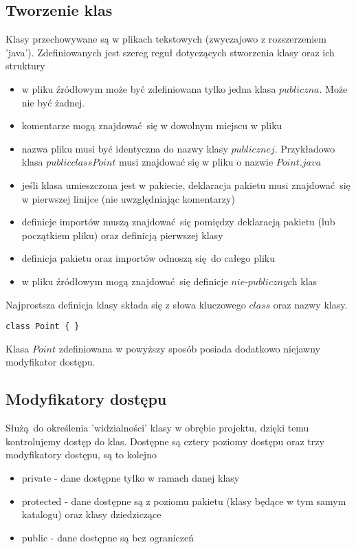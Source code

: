 \documentclass[11pt]{article}
\begin{document}
\subsection{Tworzenie klas}
Klasy przechowywane są w plikach tekstowych (zwyczajowo z rozszerzeniem 'java'). Zdefiniowanych jest szereg reguł dotyczących stworzenia klasy oraz ich struktury
\begin{itemize}
\item w pliku źródłowym może być zdefiniowana tylko jedna klasa $\textit{publiczna}$. Może nie być żadnej.
\item komentarze mogą znajdować się w dowolnym miejscu w pliku
\item nazwa pliku musi być identyczna do nazwy klasy $\textit{publicznej}$. Przykładowo klasa $public class Point { }$ musi znajdować się w pliku o nazwie $Point.java$
\item jeśli klasa umieszczona jest w pakiecie, deklaracja pakietu musi znajdować się w pierwszej linijce (nie uwzględniając komentarzy)
\item definicje importów muszą znajdować się pomiędzy deklaracją pakietu (lub początkiem pliku) oraz definicją pierwszej klasy
\item definicja pakietu oraz importów odnoszą się do całego pliku
\item w pliku źródłowym mogą znajdować się definicje $\textit{nie-publicznych}$ klas
\end{itemize}

Najprostsza definicja klasy składa się z słowa kluczowego $\textit{class}$ oraz nazwy klasy.
\begin{lstlisting}
class Point { }
\end{lstlisting}
Klasa $\textit{Point}$ zdefiniowana w powyższy sposób posiada dodatkowo niejawny modyfikator dostępu. 

 	
\subsection{Modyfikatory dostępu}
Służą do określenia 'widzialności' klasy w obrębie projektu, dzięki temu kontrolujemy dostęp do klas.
Dostępne są cztery poziomy dostępu oraz trzy modyfikatory dostępu, są to kolejno
\begin{itemize}
\item private - dane dostępne tylko w ramach danej klasy
\item protected - dane dostępne są z poziomu pakietu (klasy będące w tym samym katalogu) oraz klasy dziedziczące
\item public - dane dostępne są bez ograniczeń 
\end{itemize}
\end{document}
